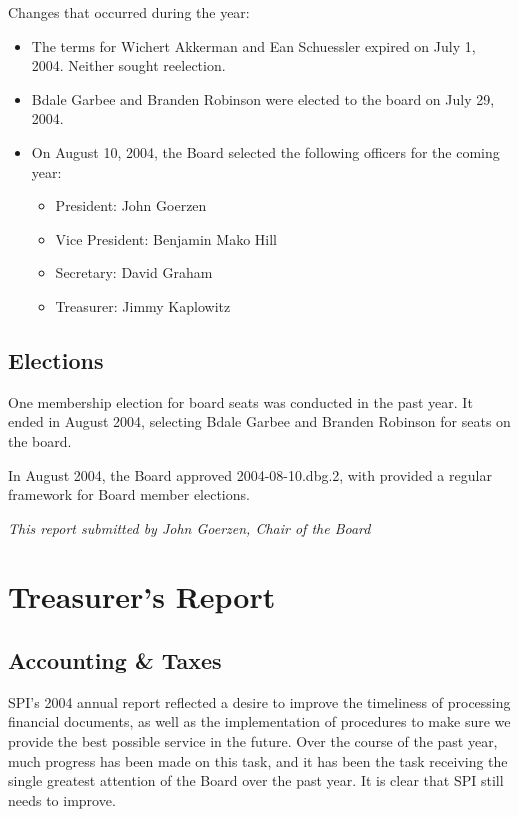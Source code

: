 \documentclass[letterpaper]{report}
\begin{document}
Changes that occurred during the year:

\begin{itemize}

\item The terms for Wichert Akkerman and Ean Schuessler expired on July 1, 2004. Neither sought reelection.
\item Bdale Garbee and Branden Robinson were elected to the board on July 29, 2004.
\item On August 10, 2004, the Board selected the following officers for the coming year:

	\begin{itemize}

	\item President: John Goerzen
	\item Vice President: Benjamin Mako Hill
	\item Secretary: David Graham
	\item Treasurer: Jimmy Kaplowitz

	\end{itemize}

\end{itemize}

\section{Elections}

One membership election for board seats was conducted in the past year. It
ended in August 2004, selecting Bdale Garbee and Branden Robinson for seats
on the board.

In August 2004, the Board approved 2004-08-10.dbg.2, with provided a
regular framework for Board member elections.

\emph{This report submitted by John Goerzen, Chair of the Board}


\chapter{Treasurer's Report}

\section{Accounting \& Taxes}

SPI's 2004 annual report reflected a desire to improve the timeliness of
processing financial documents, as well as the implementation of procedures
to make sure we provide the best possible service in the future.  Over the
course of the past year, much progress has been made on this task, and it
has been the task receiving the single greatest attention of the Board over
the past year.  It is clear that SPI still needs to improve.
\end{document}
